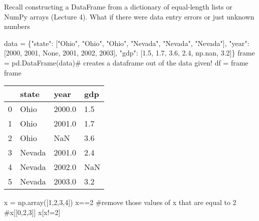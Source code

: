 \documentclass[
  letterpaper,
  DIV=11,
  numbers=noendperiod]{scrreprt}
\newenvironment{Shaded}{\begin{snugshade}}{\end{snugshade}}
\newcommand{\CommentTok}[1]{\textcolor[rgb]{0.37,0.37,0.37}{#1}}
\newcommand{\DecValTok}[1]{\textcolor[rgb]{0.68,0.00,0.00}{#1}}
\newcommand{\FloatTok}[1]{\textcolor[rgb]{0.68,0.00,0.00}{#1}}
\newcommand{\NormalTok}[1]{\textcolor[rgb]{0.00,0.23,0.31}{#1}}
\newcommand{\OperatorTok}[1]{\textcolor[rgb]{0.37,0.37,0.37}{#1}}
\newcommand{\StringTok}[1]{\textcolor[rgb]{0.13,0.47,0.30}{#1}}
\newcommand{\VariableTok}[1]{\textcolor[rgb]{0.07,0.07,0.07}{#1}}
\begin{document}
Recall constructing a DataFrame from a dictionary of equal-length lists
or NumPy arrays (Lecture 4). What if there were data entry errors or
just unknown numbers

\begin{Shaded}
\begin{Highlighting}[]
\NormalTok{data }\OperatorTok{=}\NormalTok{ \{}\StringTok{"state"}\NormalTok{: [}\StringTok{"Ohio"}\NormalTok{, }\StringTok{"Ohio"}\NormalTok{, }\StringTok{"Ohio"}\NormalTok{, }\StringTok{"Nevada"}\NormalTok{, }\StringTok{"Nevada"}\NormalTok{, }\StringTok{"Nevada"}\NormalTok{],}
        \StringTok{"year"}\NormalTok{: [}\DecValTok{2000}\NormalTok{, }\DecValTok{2001}\NormalTok{, }\VariableTok{None}\NormalTok{, }\DecValTok{2001}\NormalTok{, }\DecValTok{2002}\NormalTok{, }\DecValTok{2003}\NormalTok{],}
        \StringTok{"gdp"}\NormalTok{: [}\FloatTok{1.5}\NormalTok{, }\FloatTok{1.7}\NormalTok{, }\FloatTok{3.6}\NormalTok{, }\FloatTok{2.4}\NormalTok{, np.nan, }\FloatTok{3.2}\NormalTok{]\}}
\NormalTok{frame }\OperatorTok{=}\NormalTok{ pd.DataFrame(data)}\CommentTok{\# creates a dataframe out of the data given!}
\NormalTok{df }\OperatorTok{=}\NormalTok{ frame}
\NormalTok{frame}
\end{Highlighting}
\end{Shaded}

\begin{longtable}[]{@{}llll@{}}
\toprule()
& state & year & gdp \\
\midrule()
\endhead
0 & Ohio & 2000.0 & 1.5 \\
1 & Ohio & 2001.0 & 1.7 \\
2 & Ohio & NaN & 3.6 \\
3 & Nevada & 2001.0 & 2.4 \\
4 & Nevada & 2002.0 & NaN \\
5 & Nevada & 2003.0 & 3.2 \\
\bottomrule()
\end{longtable}

\begin{Shaded}
\begin{Highlighting}[]
\NormalTok{x }\OperatorTok{=}\NormalTok{ np.array([}\DecValTok{1}\NormalTok{,}\DecValTok{2}\NormalTok{,}\DecValTok{3}\NormalTok{,}\DecValTok{4}\NormalTok{])}
\NormalTok{x}\OperatorTok{==}\DecValTok{2}
\CommentTok{\#remove those values of x that are equal to 2}
\CommentTok{\#x[[0,2,3]]}
\NormalTok{x[x}\OperatorTok{!=}\DecValTok{2}\NormalTok{]}
\end{Highlighting}
\end{Shaded}
\end{document}

